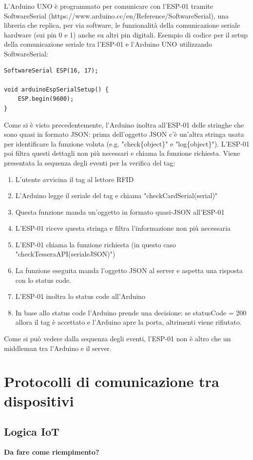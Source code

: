 \documentclass[12pt]{report}
\begin{document}
L'Arduino UNO è programmato per comunicare con l'ESP-01 tramite SoftwareSerial (https://www.arduino.cc/en/Reference/SoftwareSerial), una libreria che replica, per via software, le funzionalità della comunicazione seriale hardware (sui pin 0 e 1) anche su altri pin digitali. Esempio di codice per il setup della comunicazione seriale tra l'ESP-01 e l'Arduino UNO utilizzando SoftwareSerial:
\begin{lstlisting}
SoftwareSerial ESP(16, 17);

void arduinoEspSerialSetup() {
	ESP.begin(9600);
}
\end{lstlisting}
Come si è visto precedentemente, l'Arduino inoltra all'ESP-01 delle stringhe che sono quasi in formato JSON: prima dell'oggetto JSON c'è un'altra stringa usata per identificare la funzione voluta (e.g$.$ "check\{object\}" e "log\{object\}"). L'ESP-01 poi filtra questi dettagli non più necessari e chiama la funzione richiesta. Viene presentata la sequenza degli eventi per la verifica del tag:

\begin{enumerate}
	\item L'utente avvicina il tag al lettore RFID
	\item L'Arduino legge il seriale del tag e chiama "checkCardSerial(serial)"
	\item Questa funzione manda un'oggetto in formato quasi-JSON all'ESP-01
	\item L'ESP-01 riceve questa stringa e filtra l'informazione non più necessaria
	\item L'ESP-01 chiama la funzione richiesta (in questo caso "checkTesseraAPI(serialeJSON)")
	\item La funzione eseguita manda l'oggetto JSON al server e aspetta una risposta con lo status code.
	\item L'ESP-01 inoltra lo status code all'Arduino
	\item In base allo status code l'Arduino prende una decisione: se statusCode = 200 allora il tag è accettato e l'Arduino apre la porta, altrimenti viene rifiutato.
\end{enumerate}
Come si può vedere dalla sequenza degli eventi, l'ESP-01 non è altro che un middleman tra l'Arduino e il server.
%
\section{Protocolli di comunicazione tra dispositivi}
%
%
\subsection{Logica IoT}
%
\textbf{Da fare come riempimento?}
\end{document}
